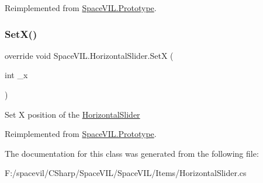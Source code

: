 Reimplemented from \mbox{\hyperlink{class_space_v_i_l_1_1_prototype_ae96644a6ace490afb376fb542161e541}{Space\+V\+I\+L.\+Prototype}}.

\mbox{\label{class_space_v_i_l_1_1_horizontal_slider_ab674da8d7310f5b68f9c85975073b076}} 
\subsubsection{\texorpdfstring{Set\+X()}{SetX()}}
{\footnotesize\ttfamily override void Space\+V\+I\+L.\+Horizontal\+Slider.\+SetX (\begin{DoxyParamCaption}\item[{int}]{\+\_\+x }\end{DoxyParamCaption})\hspace{0.3cm}{\ttfamily [virtual]}}



Set X position of the \mbox{\hyperlink{class_space_v_i_l_1_1_horizontal_slider}{Horizontal\+Slider}} 



Reimplemented from \mbox{\hyperlink{class_space_v_i_l_1_1_prototype}{Space\+V\+I\+L.\+Prototype}}.



The documentation for this class was generated from the following file\+:\begin{DoxyCompactItemize}
\item 
F\+:/spacevil/\+C\+Sharp/\+Space\+V\+I\+L/\+Space\+V\+I\+L/\+Items/Horizontal\+Slider.\+cs\end{DoxyCompactItemize}
